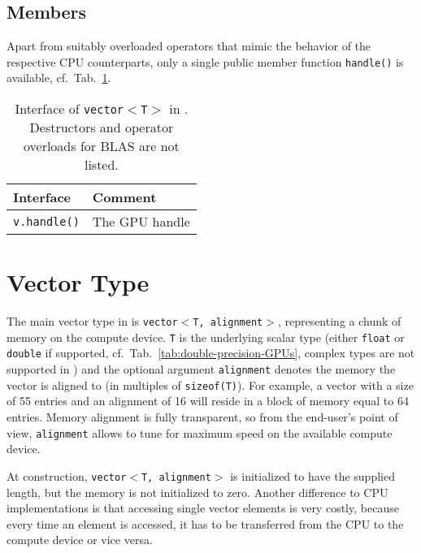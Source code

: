
\subsection{Members}
Apart from suitably overloaded operators that mimic the behavior of the
respective CPU counterparts, only a single public member function
\lstinline|handle()| is available, cf.~Tab.~\ref{tab:scalar-interface}.

\begin{table}[tb]
\begin{center}
\begin{tabular}{p{6.5cm}|p{8.5cm}}
Interface & Comment\\
\hline
\texttt{v.handle()}   & The GPU handle \\
\end{tabular}
\caption{Interface of \texttt{vector$<$T$>$} in \ViennaCL. Destructors and
operator overloads for BLAS are not listed.}
\label{tab:scalar-interface}
\end{center}
\end{table}



\section{Vector Type}
The main vector type in {\ViennaCL} is \texttt{vector$<$T, alignment$>$},
representing a chunk of memory on the compute device. \texttt{T} is the
underlying scalar type (either \texttt{float} or \texttt{double} if supported, cf.~Tab.~\ref{tab:double-precision-GPUs}, complex types
are not supported in \ViennaCLversion) and the optional argument \texttt{alignment} denotes the memory
the vector is aligned to (in multiples of \texttt{sizeof(T)}). For example, a
vector with a size of 55 entries and an alignment of 16 will reside in a
block of memory equal to 64 entries. Memory alignment is fully
transparent, so from the end-user's point of view, \texttt{alignment} allows to
tune {\ViennaCL} for maximum speed on the available compute device.

At construction, \texttt{vector$<$T, alignment$>$} is initialized to have the
supplied length, but the memory is not initialized to zero. Another difference
to CPU implementations is that accessing single vector elements is very costly,
because every time an element is
accessed, it has to be transferred from the CPU to the compute device or vice
versa. 
